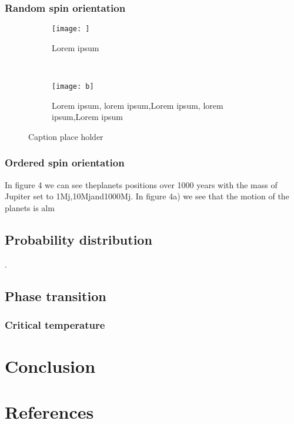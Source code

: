 \documentclass{article}
\begin{document}
\subsubsection*{Random spin orientation}
\begin{figure*}[t!]
    \centering
    \begin{subfigure}[t]{0.5\textwidth}
        \centering
        \texttt{[image: ]}
        \caption{Lorem ipsum}
    \end{subfigure}%
    ~ 
    \begin{subfigure}[t]{0.5\textwidth}
        \centering
        \texttt{[image: b]}
        \caption{Lorem ipsum, lorem ipsum,Lorem ipsum, lorem ipsum,Lorem ipsum}
    \end{subfigure}
    \caption{Caption place holder}
\end{figure*}


\subsubsection*{Ordered spin orientation}


 In  figure  4  we  can  see  theplanets positions over 1000 years with the mass of Jupiter set to 1Mj,10Mjand1000Mj.  In figure 4a) we see that the motion of the planets is alm

\subsection*{Probability distribution}.
\subsection*{Phase transition}
\subsubsection*{Critical temperature}
\section*{Conclusion}
\section*{References}
\end{document}
